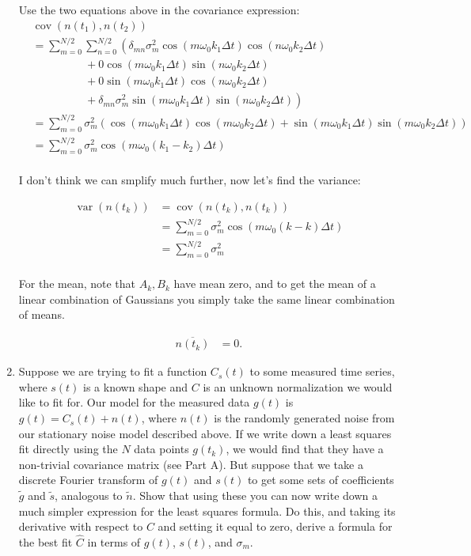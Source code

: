 \begin{enumerate}[label=\textbf{\Alph*}.]
    Use the two equations above in the covariance expression:
    \begin{align*}
        &\operatorname{cov}(n(t_1), n(t_2)) \\
        &= \sum_{m=0}^{N/2} \sum_{n=0}^{N/2} \left(\delta_{mn}\sigma_m^2\cos(m\omega_0 k_1\Delta t)\cos(n\omega_0 k_2\Delta t)\right. \\
        &\hspace{2cm}+ 0\cos(m\omega_0 k_1\Delta t)\sin(n\omega_0 k_2\Delta t) \\
        &\hspace{2cm}+ 0\sin(m\omega_0 k_1\Delta t)\cos(n\omega_0 k_2\Delta t) \\
        &\hspace{2cm}+\left.\delta_{mn}\sigma_m^2 \sin(m\omega_0 k_1\Delta t)\sin(n\omega_0 k_2\Delta t)\right) \\
        &= \sum_{m=0}^{N/2} \sigma_m^2\left(\cos(m\omega_0 k_1\Delta t)\cos(m\omega_0 k_2\Delta t) + \sin(m\omega_0 k_1\Delta t)\sin(m\omega_0 k_2\Delta t)\right) \\
        &= \sum_{m=0}^{N/2} \sigma_m^2\cos(m\omega_0 (k_1-k_2)\Delta t) \\
    \end{align*}

    I don't think we can smplify much further, now let's find the variance:

    \begin{align*}
        \operatorname{var}(n(t_k)) &=\operatorname{cov}(n(t_k), n(t_k)) \\
        &= \sum_{m=0}^{N/2} \sigma_m^2\cos(m\omega_0 (k-k)\Delta t) \\
        &= \sum_{m=0}^{N/2} \sigma_m^2 \\
    \end{align*}

    For the mean, note that $A_k, B_k$ have mean zero, and to get the mean of a linear combination of Gaussians you simply take the same linear combination of means.

    \begin{align*}
        \overline{n(t_k)} &= 0.
    \end{align*}

    \item Suppose we are trying to fit a function $C_s(t)$ to some measured time series, where $s(t)$ is a known shape and $C$ is an unknown normalization we would like to fit for. Our model for the measured data $g(t)$ is $g(t) = C_s(t) + n(t)$, where $n(t)$ is the randomly generated noise from our stationary noise model described above. If we write down a least squares fit directly using the $N$ data points $g(t_k)$, we would find that they have a non-trivial covariance matrix (see Part A). But suppose that we take a discrete Fourier transform of $g(t)$ and $s(t)$ to get some sets of coefficients $\tilde{g}$ and $\tilde{s}$, analogous to $\tilde{n}$. Show that using these you can now write down a much simpler expression for the least squares formula. Do this, and taking its derivative with respect to $C$ and setting it equal to zero, derive a formula for the best fit $\hat{C}$ in terms of $g(t)$, $s(t)$, and $\sigma_m$.


\end{enumerate}
